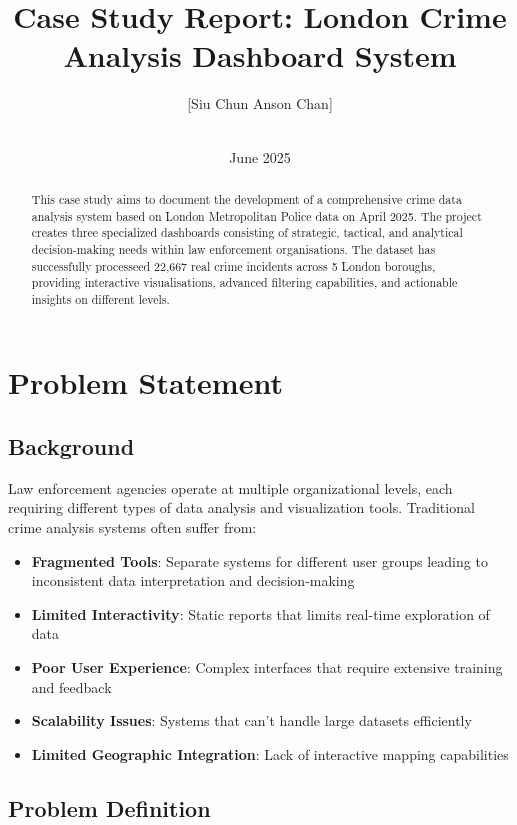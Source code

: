 \documentclass[12pt,a4paper]{article}
\title{\textbf{Case Study Report: London Crime Analysis Dashboard System}}
\author{[Siu Chun Anson Chan] \\ [Knowledge extraction, modelling and Visualisation] \\ [Modul University]}
\date{June 2025}
\begin{document}
\maketitle
\thispagestyle{fancy}

\begin{abstract}
This case study aims to document the development of a comprehensive crime data analysis system based on London Metropolitan Police data on April 2025. 
The project  creates three specialized dashboards consisting of strategic, tactical, and analytical decision-making needs within law enforcement organisations. 
The dataset has successfully processeed 22,667 real crime incidents across 5 London boroughs, providing interactive visualisations, advanced filtering capabilities,
and actionable insights on different levels.
\end{abstract}

\tableofcontents
\newpage

\section{Problem Statement}

\subsection{Background}

Law enforcement agencies operate at multiple organizational levels, each requiring different types of data analysis and visualization tools. 
Traditional crime analysis systems often suffer from:

\begin{itemize}
    \item \textbf{Fragmented Tools}: Separate systems for different user groups leading to inconsistent data interpretation and decision-making
    \item \textbf{Limited Interactivity}: Static reports that limits real-time exploration of data
    \item \textbf{Poor User Experience}: Complex interfaces that require extensive training and feedback
    \item \textbf{Scalability Issues}: Systems that can't handle large datasets efficiently
    \item \textbf{Limited Geographic Integration}: Lack of interactive mapping capabilities
\end{itemize}

\subsection{Problem Definition}
\end{document}
